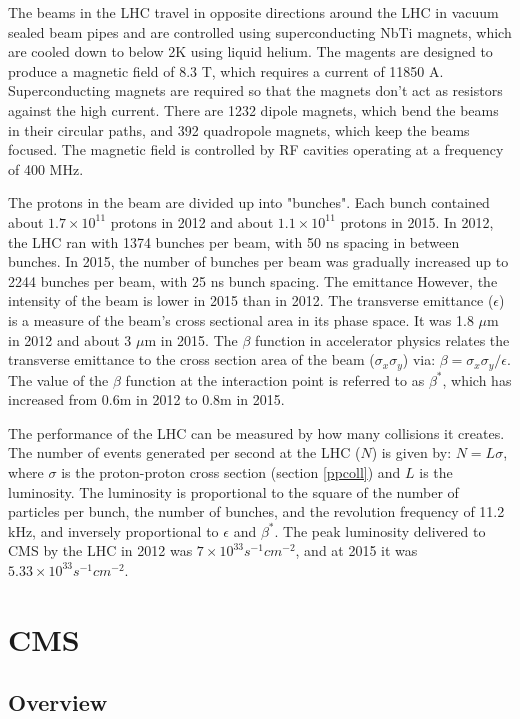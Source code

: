 \documentclass[oneside, letterpaper, oldfontcommands]{memoir}
\begin{document}
\qquad The beams in the LHC travel in opposite directions around the LHC in vacuum sealed beam pipes and are controlled using superconducting NbTi magnets, which are cooled down to below 2K using liquid helium. The magents are designed to produce a magnetic field of 8.3 T, which requires a current of 11850 A. Superconducting magnets are required so that the magnets don't act as resistors against the high current. There are 1232 dipole magnets, which bend the beams in their circular paths, and 392 quadropole magnets, which keep the beams focused. The magnetic field is controlled by RF cavities operating at a frequency of 400 MHz.

\qquad The protons in the beam are divided up into "bunches". Each bunch contained about $1.7 \times 10^{11}$ protons in 2012 and about $1.1 \times 10^{11}$ protons in 2015. In 2012, the LHC ran with 1374 bunches per beam, with 50 ns spacing in between bunches. In 2015, the number of bunches per beam was gradually increased up to 2244 bunches per beam, with 25 ns bunch spacing. The emittance  However, the intensity of the beam is lower in 2015 than in 2012. The transverse emittance ($\epsilon$) is a measure of the beam's cross sectional area in its phase space. It was 1.8 $\mu$m in 2012 and about 3 $\mu$m in 2015. The $\beta$ function in accelerator physics relates the transverse emittance to the cross section area of the beam ($\sigma_{x}\sigma_{y}$) via: $ \beta	= \sigma_{x}\sigma_{y} / \epsilon$. The value of the $\beta$ function at the interaction point is referred to as $\beta^{*}$, which has increased from 0.6m in 2012 to 0.8m in 2015.

\qquad The performance of the LHC can be measured by how many collisions it creates. The number of events generated per second at the LHC ($N$) is given by: $N = L\sigma$, where $\sigma$ is the proton-proton cross section (section \ref{ppcoll}) and $L$ is the luminosity. The luminosity is proportional to the square of the number of particles per bunch, the number of bunches, and the revolution frequency of 11.2 kHz, and inversely proportional to $\epsilon$ and $\beta^{*}$. The peak luminosity delivered to CMS by the LHC in 2012 was $7 \times 10^{33} s^{-1} cm^{-2}$, and at 2015 it was $5.33 \times 10^{33} s^{-1} cm^{-2}$. 


\section{CMS}\label{cms}
\subsection{Overview}
\end{document}

